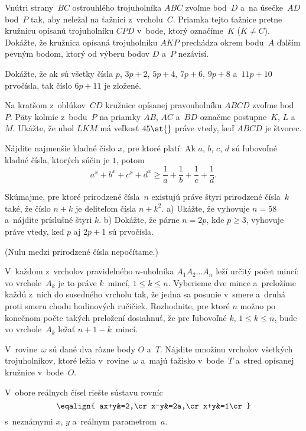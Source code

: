 {%
Vnútri strany~$BC$ ostrouhlého trojuholníka $ABC$ zvoľme bod~$D$ a~na úsečke~$AD$ bod~$P$ tak, aby neležal na ťažnici z~vrcholu~$C$. Priamka tejto ťažnice pretne kružnicu opísanú trojuholníku $CPD$ v~bode, ktorý označíme~$K$ ($K\ne C$).
Dokážte, že kružnica opísaná trojuholníku $AKP$ prechádza okrem bodu~$A$ ďalším pevným bodom, ktorý od výberu bodov $D$ a~$P$ nezávisí.}

{%
Dokážte, že ak sú všetky čísla $p$, $3p+2$, $5p+4$, $7p+6$, $9p+8$ a~$11p+10$ prvočísla, tak číslo $6p+11$ je zložené.}

{%
Na kratšom z~oblúkov~$CD$ kružnice opísanej pravouholníku $ABCD$ zvoľme bod~$P$. Päty kolmíc z~bodu~$P$ na priamky $AB$, $AC$ a~$BD$ označme postupne~$K$, $L$ a~$M$. Ukážte, že uhol $LKM$ má veľkosť $45\st{}$ práve vtedy, keď $ABCD$ je štvorec.}

{%
Nájdite najmenšie kladné číslo $x$, pre ktoré platí: Ak $a$, $b$, $c$, $d$ sú ľubovoľné kladné čísla, ktorých súčin je $1$, potom
$$
a^x+b^x+c^x+d^x \ge \frac1a + \frac1b + \frac1c + \frac1d.
$$}

{%
Skúmajme, pre ktoré prirodzené čísla~$n$ existujú práve štyri prirodzené čísla~$k$ také, že číslo $n+k$ je deliteľom čísla $n+k^2$.
 \ite a) Ukážte, že vyhovuje $n=58$ a~nájdite príslušné štyri $k$.
 \ite b) Dokážte, že párne $n=2p$, kde $p\ge3$, vyhovuje práve vtedy, keď $p$ aj $2p+1$ sú prvočísla.
 
(Nulu medzi prirodzené čísla nepočítame.)}

{%
V~každom z~vrcholov pravidelného $n$-uholníka $A_1A_2\dots A_n$ leží určitý počet mincí: vo vrchole~$A_k$ je to práve $k$~mincí, $1\le k\le n$. Vyberieme dve mince a~preložíme každú z~nich do susedného vrcholu tak, že jedna sa posunie v~smere a~druhá proti smeru chodu hodinových ručičiek. Rozhodnite, pre ktoré $n$ možno po konečnom počte takých preložení dosiahnuť, že pre ľubovoľné $k$, $1\le k\le n$, bude vo vrchole~$A_k$ ležať $n+1-k$~mincí.}

{%
V~rovine~$\omega$ sú dané dva rôzne body $O$ a~$T$. Nájdite množinu vrcholov všetkých trojuholníkov, ktoré ležia v~rovine~$\omega$ a~majú ťažisko v~bode~$T$ a~stred opísanej kružnice v~bode~$O$.}

{%
V~obore reálnych čísel riešte sústavu rovníc
$$\eqalign{
 ax+y&=2,\cr
  x-y&=2a,\cr
  x+y&=1\cr}
$$
s~neznámymi $x$, $y$ a~reálnym parametrom~$a$.}

